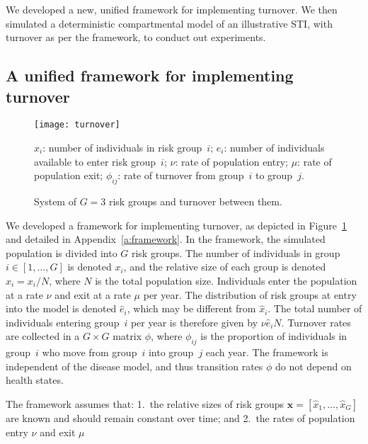 We developed a new, unified framework for implementing turnover. 
We then simulated a deterministic compartmental model of an illustrative STI,
with turnover as per the framework,
to conduct out experiments.
\subsection{A unified framework for implementing turnover}
\label{ss:framework}
\begin{figure}
  \centerline{\texttt{[image: turnover]}}
  \caption{System of $G = 3$ risk groups and turnover between them.}
  \footnotesize
  $x_i$: number of individuals in risk group~$i$;
  $e_i$: number of individuals available to enter risk group~$i$;
  $\nu$: rate of population entry;
  $\mu$: rate of population exit;
  $\phi_{ij}$: rate of turnover from group~$i$ to group~$j$.
  \label{fig:system}
\end{figure}
We developed a framework for implementing turnover,  
as depicted in Figure~\ref{fig:system}
and detailed in Appendix~\ref{a:framework}. 
In the framework, the simulated population is divided into $G$ risk groups.
The number of individuals in group $i \in [1, \dots, G]$ is denoted $x_i$,
and the relative size of each group is denoted $\hat{x}_i = x_i / N$,
where $N$ is the total population size.
Individuals enter the population at a rate $\nu$ and exit at a rate $\mu$ per year.
The distribution of risk groups at entry into the model
is denoted $\hat{e}_i$, which may be different from $\hat{x}_i$.
The total number of individuals entering group~$i$ per year
is therefore given by $\nu \hat{e}_i N$.
Turnover rates are collected in a $G \times G$ matrix $\phi$,
where $\phi_{ij}$ is the proportion of individuals in group~$i$
who move from group~$i$ into group~$j$ each year.
The framework is independent of the disease model,
and thus transition rates $\phi$ do not depend on health states.
\par
The framework assumes that:
1.~the relative sizes of risk groups
$\bm{\hat{x}} = [\hat{x}_1, \dots, \hat{x}_G]$
are known and should remain constant over time; and
2.~the rates of population entry $\nu$ and exit $\mu$

